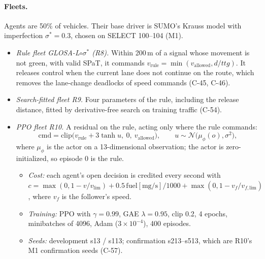 \documentclass[11pt]{article}
\begin{document}
\paragraph{Fleets.} Agents are 50\% of vehicles. Their base driver is SUMO's Krauss model with imperfection $\sigma^*=0.3$, chosen on SELECT
100--104 (M1).
\begin{itemize}\setlength\itemsep{0pt}
\item \emph{Rule fleet GLOSA-L$\circ\sigma^*$ (R8).} Within 200\,m of a signal whose movement is not green, with valid SPaT, it commands
$v_{\mathrm{rule}}=\min(v_{\mathrm{allowed}},d/\mathit{ttg})$. It releases control when the current lane does not continue on the route,
which removes the lane-change deadlocks of speed commands (C-45, C-46).
\item \emph{Search-fitted fleet R9.} Four parameters of the rule, including the release distance, fitted by derivative-free search on
training traffic (C-54).
\item \emph{PPO fleet R10.} A residual on the rule, acting only where the rule commands:
\[\mathrm{cmd}=\mathrm{clip}\big(v_{\mathrm{rule}}+3\tanh u,\ 0,\ v_{\mathrm{allowed}}\big),\qquad u\sim\mathcal N\big(\mu_\phi(o),\sigma^2\big),\]
where $\mu_\phi$ is the actor on a 13-dimensional observation; the actor is zero-initialized, so episode 0 is the rule.
\begin{itemize}\setlength\itemsep{0pt}
\item \emph{Cost:} each agent's open decision is credited every second with
$c=\max(0,1-v/v_{\mathrm{lim}})+0.5\,\mathrm{fuel}[\mathrm{mg/s}]/1000+\max(0,1-v_f/v_{f,\mathrm{lim}})$, where $v_f$ is the follower's speed.
\item \emph{Training:} PPO with $\gamma=0.99$, GAE $\lambda=0.95$, clip 0.2, 4 epochs, minibatches of 4096, Adam ($3\times10^{-4}$), 400
episodes.
\item \emph{Seeds:} development s13 / s113; confirmation s213--s513, which are R10's M1 confirmation seeds (C-57).
\end{itemize}
\end{itemize}
\end{document}
